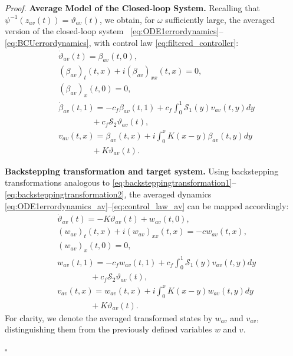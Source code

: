 \documentclass[letterpaper, 10 pt, conference]{ieeeconf}  %
\newenvironment{pf}
{\noindent\textit{Proof.}\hspace{1.2mm}}
{\hspace{\fill}$\square$}
\begin{document}
\begin{pf} 
\textbf{Average Model of the Closed-loop System.} Recalling that $\psi^{-1}(z_{av}(t))=\vartheta_{av}(t)$, we obtain, for $\omega$ sufficiently large, the averaged version of the closed-loop system~ \eqref{eq:ODE1errordynamics}–\eqref{eq:BCUerrordynamics}, with control law \eqref{eq:filtered_controller}:
\begin{align}
    &\dot{\vartheta}_{av}(t) = \beta_{av}(t,0), \label{eq:ODE1errordynamics_av}\\
    &(\beta_{av})_{t}(t,x) + i(\beta_{av})_{xx}(t,x) = 0, \label{eq:PDEerrordynamics_av}\\
    &(\beta_{av})_{x}(t,0) = 0, \label{eq:BC0errordynamics_av}\\
    &\dot{\beta}_{av}(t,1) = - c_{f}\beta_{av}(t,1) +
    c_f\int_0^1\mathcal{S}_1(y)v_{av}(t,y)dy \nonumber\\
 &\qquad\qquad\!\! +c_f\mathcal{S}_2 \vartheta_{av}(t),\label{eq:BCUerrordynamics_av}\\
 &v_{av}(t,x) = \beta_{av}(t,x) + i\int_{0}^{x}K(x-y)\beta_{av}(t,y)dy\nonumber\\
 &\qquad\qquad\!\! +K\vartheta_{av}(t).\label{eq:control_law_av}
\end{align}

\textbf{Backstepping transformation and target system.} Using backstepping transformations analogous to \eqref{eq:backsteppingtransformation1}–\eqref{eq:backsteppingtransformation2}, the averaged dynamics \eqref{eq:ODE1errordynamics_av}–\eqref{eq:control_law_av} can be mapped accordingly:
\begin{align}
    &\dot{\vartheta}_{av}(t) = -K\vartheta_{av}(t) + w_{av}(t,0), \label{eq:target_ode_av}\\
    &(w_{av})_{t}(t,x) + i (w_{av})_{xx}(t,x)= - c w_{av}(t,x), \label{eq:target_pde_av}\\
    &(w_{av})_{x}(t,0) = 0, \label{eq:target_bc_av}\\
    &w_{av}(t,1) = - c_{f}w_{av}(t,1) +
    c_f\int_0^1\mathcal{S}_1(y)v_{av}(t,y)dy \nonumber\\
 &\qquad\qquad\!\! +c_f\mathcal{S}_2\vartheta_{av}(t),\label{eq:BCUerrordynamics_av}\\
 &v_{av}(t,x) = w_{av}(t,x) + i\int_{0}^{x}K(x-y)w_{av}(t,y)dy\nonumber\\
 &\qquad\qquad\!\! +K\vartheta_{av}(t).
\end{align}
For clarity, we denote the averaged transformed states by $w_{av}$ and $v_{av}$, distinguishing them from the previously defined variables $w$ and $v$.


\end{pf}
\end{document}
